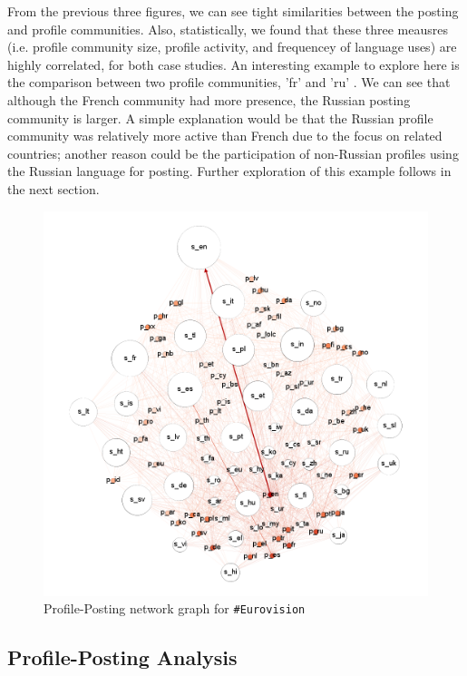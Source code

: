 From the previous three figures, we can see tight similarities between the
posting and profile communities. Also, statistically, we found that these three meausres 
(i.e. profile community size, profile activity, and frequencey of language uses) are 
highly correlated, for both case studies. An interesting example to explore here is 
the comparison between two profile communities, 'fr' and 'ru' . 
We can see that although the French community had more presence, the 
Russian posting community is larger. A simple explanation would be 
that the Russian profile community was relatively more active than French due to the focus on related
countries; another reason could be the participation of non-Russian
profiles using the Russian language for posting. Further exploration of this example follows
in the next section.

\begin{figure}[htb]
\centering
\includegraphics[width=\columnwidth]{images/euro_pslang.png}
\caption{Profile-Posting network graph for {\texttt{\#Eurovision}}}
\label{fig:eurovisionpslang}
\end{figure}

\subsection{Profile-Posting Analysis}\label{eurovisionppanalysis}


